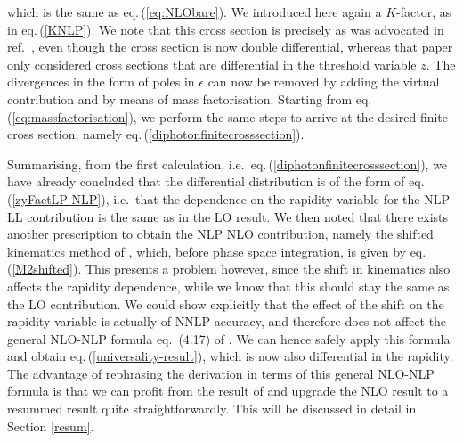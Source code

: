 \documentclass[11pt]{article}
\newcommand\eqn[1]     {eq.\,(\ref{#1})}
\begin{document}
which is the same as \eqn{eq:NLObare}. We introduced here again a $K$-factor, as in \eqn{KNLP}. We note that this cross section is precisely as was advocated in ref.~\cite{DelDuca:2017twk}, even though the cross section is now double differential, whereas that paper only considered cross sections that are differential in the threshold variable $z$. The divergences in the form of poles in $\epsilon$ can now be removed by adding the virtual contribution and by means of mass factorisation. Starting from \eqn{eq:massfactorisation}, we perform the same steps to arrive at the desired finite cross section, namely \eqn{diphotonfinitecrosssection}. 

Summarising, from the first calculation, i.e.\ \eqn{diphotonfinitecrosssection}, we have already concluded that the differential distribution is of the form of \eqn{zyFactLP-NLP}, i.e.\ that the dependence on the rapidity variable for the NLP LL contribution is the same as in the LO result. We then noted that there exists another prescription to obtain the NLP NLO contribution, namely the shifted kinematics method of \cite{DelDuca:2017twk}, which, before phase space integration, is given by \eqn{M2shifted}. This presents a problem however, since the shift in kinematics also affects the rapidity dependence, while we know that this should stay the same as the LO contribution. We could show explicitly that the effect of the shift on the rapidity variable is actually of NNLP accuracy, and therefore does not affect the general NLO-NLP formula eq.\ (4.17) of \cite{DelDuca:2017twk}. We can hence safely apply this formula and obtain \eqn{universality-result}, which is now also differential in the rapidity. The advantage of rephrasing the derivation in terms of this general NLO-NLP formula is that we can profit from the result of \cite{Bahjat-Abbas:2019fqa} and upgrade the NLO result to a resummed result quite straightforwardly. This will be discussed in detail in Section \ref{resum}.
\end{document}
